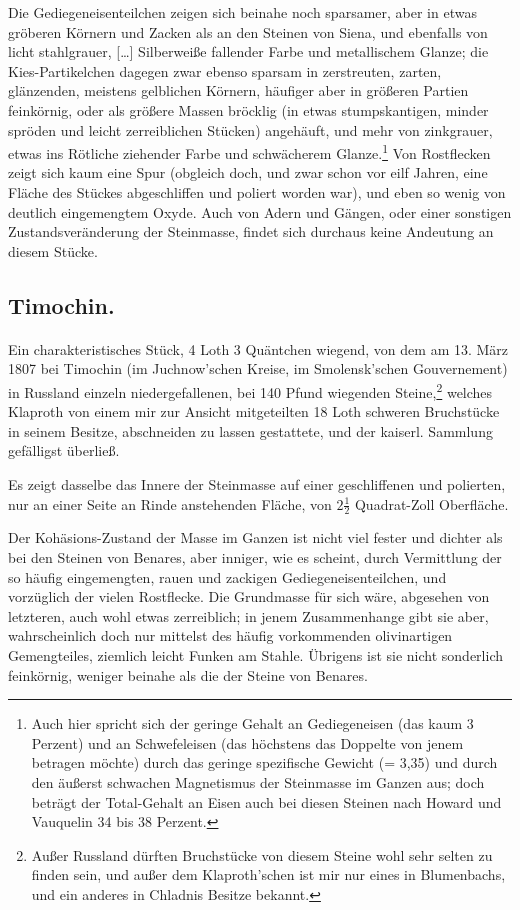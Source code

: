 \documentclass[a4paper, 11pt, oneside, german]{article}
\begin{document}
Die Gediegeneisenteilchen zeigen sich beinahe noch sparsamer, aber in etwas gröberen Körnern und Zacken als an den Steinen von Siena, und ebenfalls von licht stahlgrauer, […] Silberweiße fallender Farbe und metallischem Glanze; die Kies-Partikelchen dagegen zwar ebenso sparsam in zerstreuten, zarten, glänzenden, meistens gelblichen Körnern, häufiger aber in größeren Partien feinkörnig, oder als größere Massen bröcklig (in etwas stumpskantigen, minder spröden und leicht zerreiblichen Stücken) angehäuft, und mehr von zinkgrauer, etwas ins Rötliche ziehender Farbe und schwächerem Glanze.\footnote{Auch hier spricht sich der geringe Gehalt an Gediegeneisen (das kaum 3 Perzent) und an Schwefeleisen (das höchstens das Doppelte von jenem betragen möchte) durch das geringe spezifische Gewicht (= 3,35) und durch den äußerst schwachen Magnetismus der Steinmasse im Ganzen aus; doch beträgt der Total-Gehalt an Eisen auch bei diesen Steinen nach Howard und Vauquelin 34 bis 38 Perzent.} Von Rostflecken zeigt sich kaum eine Spur (obgleich doch, und zwar schon vor eilf Jahren, eine Fläche des Stückes abgeschliffen und poliert worden war), und eben so wenig von deutlich eingemengtem Oxyde. Auch von Adern und Gängen, oder einer sonstigen Zustandsveränderung der Steinmasse, findet sich durchaus keine Andeutung an diesem Stücke.

\subsection{Timochin.}
\paragraph{}
Ein charakteristisches Stück, 4 Loth 3 Quäntchen wiegend, von dem am 13. März 1807 bei Timochin (im Juchnow'schen Kreise, im Smolensk'schen Gouvernement) in Russland einzeln niedergefallenen, bei 140 Pfund wiegenden Steine,\footnote{Außer Russland dürften Bruchstücke von diesem Steine wohl sehr selten zu finden sein, und außer dem Klaproth'schen ist mir nur eines in Blumenbachs, und ein anderes in Chladnis Besitze bekannt.} welches Klaproth von einem mir zur Ansicht mitgeteilten 18 Loth schweren Bruchstücke in seinem Besitze, abschneiden zu lassen gestattete, und der kaiserl. Sammlung gefälligst überließ.

Es zeigt dasselbe das Innere der Steinmasse auf einer geschliffenen und polierten, nur an einer Seite an Rinde anstehenden Fläche, von $2\frac{1}{2}$ Quadrat-Zoll Oberfläche.

Der Kohäsions-Zustand der Masse im Ganzen ist nicht viel fester und dichter als bei den Steinen von Benares, aber inniger, wie es scheint, durch Vermittlung der so häufig eingemengten, rauen und zackigen Gediegeneisenteilchen, und vorzüglich der vielen Rostflecke. Die Grundmasse für sich wäre, abgesehen von letzteren, auch wohl etwas zerreiblich; in jenem Zusammenhange gibt sie aber, wahrscheinlich doch nur mittelst des häufig vorkommenden olivinartigen Gemengteiles, ziemlich leicht Funken am Stahle. Übrigens ist sie nicht sonderlich feinkörnig, weniger beinahe als die der Steine von Benares.
\end{document}
